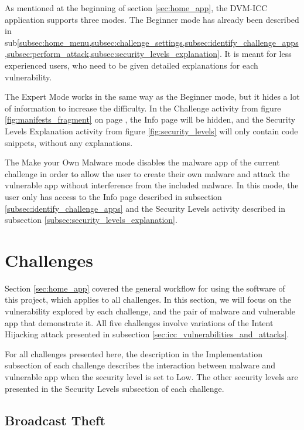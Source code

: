     As mentioned at the beginning of section \ref{sec:home_app}, the DVM-ICC application supports three modes. The Beginner mode has already been described in sub\cref{subsec:home_menu,subsec:challenge_settings,subsec:identify_challenge_apps,subsec:perform_attack,subsec:security_levels_explanation}. It is meant for less experienced users, who need to be given detailed explanations for each vulnerability.
    
    The Expert Mode works in the same way as the Beginner mode, but it hides a lot of information to increase the difficulty. In the Challenge activity from figure \ref{fig:manifests_fragment} on page \pageref{fig:manifests_fragment}, the Info page will be hidden, and the Security Levels Explanation activity from figure \ref{fig:security_levels} will only contain code snippets, without any explanations.
    
    The Make your Own Malware mode disables the malware app of the current challenge in order to allow the user to create their own malware and attack the vulnerable app without interference from the included malware. In this mode, the user only has access to the Info page described in subsection \ref{subsec:identify_challenge_apps} and the Security Levels activity described in subsection \ref{subsec:security_levels_explanation}.
    
    \section{Challenges}
        \label{sec:challenges}
        
    Section \ref{sec:home_app} covered the general workflow for using the software of this project, which applies to all challenges. In this section, we will focus on the vulnerability explored by each challenge, and the pair of malware and vulnerable app that demonstrate it. All five challenges involve variations of the Intent Hijacking attack presented in subsection \ref{sec:icc_vulnerabilities_and_attacks}.
    
    For all challenges presented here, the description in the Implementation subsection of each challenge describes the interaction between malware and vulnerable app when the security level is set to Low. The other security levels are presented in the Security Levels subsection of each challenge.
    
    \subsection{Broadcast Theft}
        \label{subsec:broadcast_theft}
        
